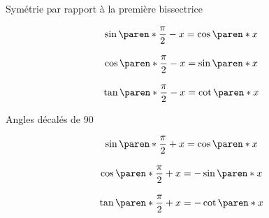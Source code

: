 \documentclass[french,xcolor=svgnames]{beamer}
\begin{document}
\begin{frame}{Symétrie par rapport à la première bissectrice}
\begin{minipage}{0.58\linewidth}
\centering
\scalebox{0.75}{}
\end{minipage}
\begin{minipage}{0.40\linewidth}
\centering
\[\begin{array}{c}
\sin\paren*{ \dfrac{\pi}{2} -x} =\cos\paren*{ x} \\ \\
\cos\paren*{ \dfrac{\pi}{2} -x} =\sin\paren*{ x} \\ \\
\tan\paren*{ \dfrac{\pi}{2} -x} =\cot\paren*{ x}
\end{array}\]
\end{minipage}
\end{frame}

\begin{frame}{Angles décalés de 90\degre}
\begin{minipage}{0.5\linewidth}
\centering
\scalebox{0.75}{}
\end{minipage}
\begin{minipage}{0.45\linewidth}
\centering
\[\begin{array}{c}
\sin\paren*{ \dfrac{\pi}{2} +x} =\cos\paren*{ x} \\
\\
\cos\paren*{ \dfrac{\pi}{2} +x} =-\sin\paren*{ x} \\
\\
\tan\paren*{ \dfrac{\pi}{2} +x} =-\cot\paren*{ x}
\end{array}\]
\end{minipage}
\end{frame}
\end{document}
